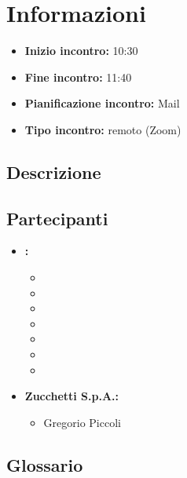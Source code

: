 \section{Informazioni}
\begin{itemize}
	\item \textbf{Inizio incontro:} 10:30
	\item \textbf{Fine incontro:} 11:40
	\item \textbf{Pianificazione incontro:} Mail
	\item \textbf{Tipo incontro:} remoto (Zoom)
\end{itemize}

\subsection{Descrizione}
\DocDescription

\subsection{Partecipanti}

\begin{itemize}
	\item \textbf{\GroupName:}
	\begin{itemize}
		\item \tommaso
		\item \marco
		\item \raul
		\item \sebastiano
		\item \martina
		\item \riccardo
		\item \mattia
	\end{itemize}

	\item \textbf{Zucchetti S.p.A.:}
	\begin{itemize}
		\item Gregorio Piccoli
	\end{itemize}

\end{itemize}

\subsection{Glossario}
\GlossarioIntroduzioneVE

\clearpage
